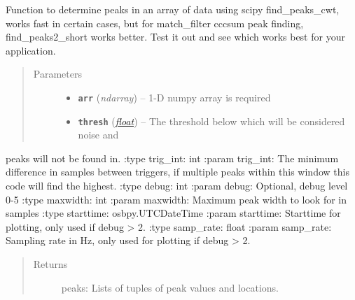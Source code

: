 \documentclass[a4paper,10pt,english]{sphinxmanual}
\begin{document}
\begin{fulllineitems}
\label{submodules/utils.findpeaks:findpeaks.find_peaks2}
Function to determine peaks in an array of data using scipy find\_peaks\_cwt, works fast in certain cases, but for match\_filter cccsum peak finding, find\_peaks2\_short works better.  Test it out and see which works best for your application.
\begin{quote}\begin{description}
\item[{Parameters}] \leavevmode\begin{itemize}
\item {} 
\textbf{\texttt{arr}} (\emph{ndarray}) -- 1-D numpy array is required

\item {} 
\textbf{\texttt{thresh}} (\href{https://docs.python.org/library/functions.html\#float}{\emph{float}}) -- The threshold below which will be considered noise and 

\end{itemize}

\end{description}\end{quote}

peaks will not be found in.
:type trig\_int: int
:param trig\_int: The minimum difference in samples between triggers, if multiple peaks within this window this code will find the highest.
:type debug: int
:param debug: Optional, debug level 0-5
:type maxwidth: int
:param maxwidth: Maximum peak width to look for in samples
:type starttime: osbpy.UTCDateTime
:param starttime: Starttime for plotting, only used if debug \textgreater{} 2.
:type samp\_rate: float
:param samp\_rate: Sampling rate in Hz, only used for plotting if debug \textgreater{} 2.
\begin{quote}\begin{description}
\item[{Returns}] \leavevmode
peaks: Lists of tuples of peak values and locations.

\end{description}\end{quote}

\end{fulllineitems}

\end{document}
